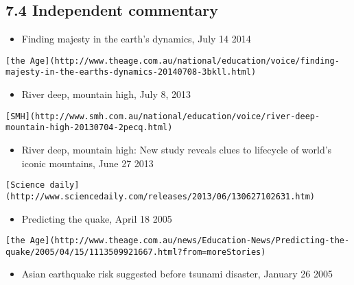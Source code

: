 \documentclass[
]{article}
\providecommand{\tightlist}{%
  \setlength{\itemsep}{0pt}\setlength{\parskip}{0pt}}
\begin{document}
\hypertarget{independent-commentary}{%
\subsection{7.4 Independent commentary}\label{independent-commentary}}

\begin{itemize}
\tightlist
\item
  Finding majesty in the earth's dynamics, July 14 2014
\end{itemize}

\begin{verbatim}
[the Age](http://www.theage.com.au/national/education/voice/finding-majesty-in-the-earths-dynamics-20140708-3bkll.html) 
\end{verbatim}

\begin{itemize}
\tightlist
\item
  River deep, mountain high, July 8, 2013
\end{itemize}

\begin{verbatim}
[SMH](http://www.smh.com.au/national/education/voice/river-deep-mountain-high-20130704-2pecq.html)
\end{verbatim}

\begin{itemize}
\tightlist
\item
  River deep, mountain high: New study reveals clues to lifecycle of
  world's iconic mountains, June 27 2013
\end{itemize}

\begin{verbatim}
[Science daily](http://www.sciencedaily.com/releases/2013/06/130627102631.htm)
\end{verbatim}

\begin{itemize}
\tightlist
\item
  Predicting the quake, April 18 2005
\end{itemize}

\begin{verbatim}
[the Age](http://www.theage.com.au/news/Education-News/Predicting-the-quake/2005/04/15/1113509921667.html?from=moreStories)
\end{verbatim}

\begin{itemize}
\tightlist
\item
  Asian earthquake risk suggested before tsunami disaster, January 26
  2005
\end{itemize}
\end{document}
